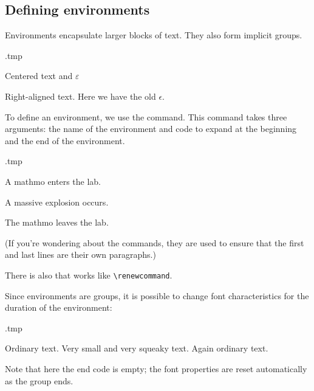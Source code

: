 %
\subsection{Defining environments}

Environments encapsulate larger blocks of text.
They also form implicit groups.

\begin{VerbatimOut}{\jobname.tmp}
\begin{center}
\renewcommand{\epsilon}{\varepsilon}
Centered text and $\epsilon$
\end{center}

\begin{flushright}
Right-aligned text.
Here we have the old $\epsilon$.
\end{flushright}
\end{VerbatimOut}
\ShowExample

To define an environment, we use the  command.
This command takes three arguments: the name of the environment
and code to expand at the beginning and the end of the environment.

\begin{VerbatimOut}{\jobname.tmp}
\newenvironment{cool}
    {A mathmo enters the lab.\par}
    {\par The mathmo leaves the lab.}

\begin{cool}
A massive explosion occurs.
\end{cool}
\end{VerbatimOut}
\ShowExample
%
(If you're wondering about the  commands,
they are used to ensure that the first and last lines are their own paragraphs.)

There is also  that works like \verb|\renewcommand|.

Since environments are groups,
it is possible to change font characteristics for the duration of the environment:

\begin{VerbatimOut}{\jobname.tmp}
\newenvironment{mouse}{\tiny}{}

Ordinary text.
\begin{mouse}
Very small and very squeaky text.
\end{mouse}
Again ordinary text.
\end{VerbatimOut}
\ShowExample
%
Note that here the end code is empty;
the font properties are reset automatically as the group ends.

